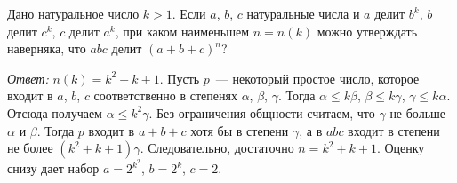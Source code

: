 Дано натуральное число $k > 1$.
Если $a$, $b$, $c$ натуральные числа и
$a$ делит $b^k$, $b$ делит $c^k$, $c$ делит $a^k$,
при каком наименьшем $n = n(k)$ можно утверждать наверняка, что
$a b c$ делит $(a + b + c)^n$?

\solution
\emph{Ответ:} $n(k) = k^2 + k + 1$.
Пусть $p$~--- некоторый простое число, которое входит в $a$, $b$, $c$
соответственно в степенях $\alpha$, $\beta$, $\gamma$.
Тогда
$\alpha \leq k \beta$, $\beta \leq k \gamma$, $\gamma \leq k \alpha$.
Отсюда получаем $\alpha \leq k^2 \gamma$.
Без ограничения общности считаем, что $\gamma$ не больше $\alpha$ и $\beta$.
Тогда $p$ входит в $a + b + c$ хотя бы в степени $\gamma$, а в $a b c$ входит в
степени не более $(k^2 + k + 1) \gamma$.
Следовательно, достаточно $n = k^2 + k + 1$.
Оценку снизу дает набор $a = 2^{k^2}$, $b = 2^k$, $c = 2$.

